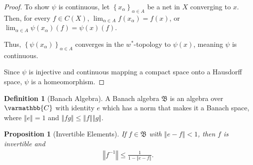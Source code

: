 \documentclass[10pt]{extarticle}
\newcommand{\C}{\mathbb{C}}
\newcommand{\norm}[1]{\left\Vert #1\right\Vert}
\newcommand{\set}[1]{\left\{#1\right\}}
\theoremstyle{plain}
\newtheorem*{proposition}{Proposition}
\theoremstyle{definition}
\newtheorem*{definition}{Definition}
\theoremstyle{note}
\renewcommand*{\mathbb}[1]{\varmathbb{#1}}
\renewcommand{\newline}{\hfill\break}
\begin{document}
\begin{proof}
  To show $\psi$ is continuous, let $\set{x_{\alpha}}_{\alpha \in A}$ be a net in $X$ converging to $x$. Then, for every $f\in C(X)$, $\lim_{\alpha \in A}f\left(x_{\alpha}\right) = f(x)$, or $\lim_{\alpha \in A}\psi\left(x_{\alpha}\right)(f) = \psi(x)(f)$.\newline

  Thus, $\set{\psi\left(x_{\alpha}\right)}_{\alpha \in A}$ converges in the $w^{\ast}$-topology to $\psi(x)$, meaning $\psi$ is continuous.\newline

  Since $\psi$ is injective and continuous mapping a compact space onto a Hausdorff space, $\psi$ is a homeomorphism.
\end{proof}
\begin{definition}[Banach Algebra]
  A Banach algebra $\mathfrak{B}$ is an algebra over $\C$ with identity $e$ which has a norm that makes it a Banach space, where $\norm{e} = 1$ and $\norm{fg} \leq \norm{f}\norm{g}$.
\end{definition}
\begin{proposition}[Invertible Elements]
  If $f\in \mathfrak{B}$ with $\norm{e-f} < 1$, then $f$ is invertible and
  \begin{align*}
    \norm{f^{-1}}\leq \frac{1}{1-\norm{e-f}}.
  \end{align*}
\end{proposition}
\end{document}
